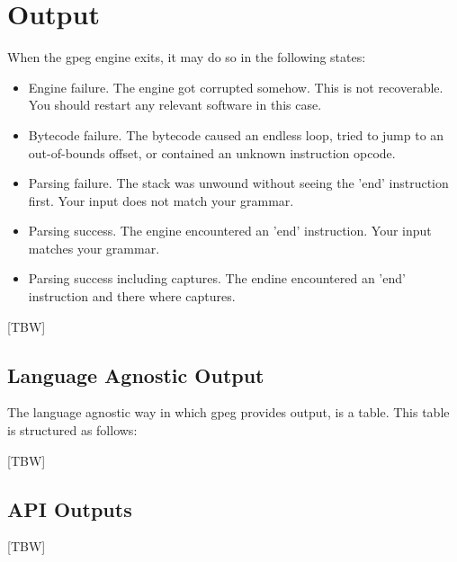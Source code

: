 \section{Output}

When the gpeg engine exits, it may do so in the following states:

\begin{itemize}
\item Engine failure. The engine got corrupted somehow. This is not
      recoverable. You should restart any relevant software in this case.
\item Bytecode failure. The bytecode caused an endless loop, tried
      to jump to an out-of-bounds offset, or contained an unknown
      instruction opcode.
\item Parsing failure. The stack was unwound without seeing the 'end'
      instruction first. Your input does not match your grammar.
\item Parsing success. The engine encountered an 'end' instruction.
      Your input matches your grammar.
\item Parsing success including captures.
      The endine encountered an 'end' instruction and there where
      captures.
\end{itemize}

[TBW]

\subsection{Language Agnostic Output}

The language agnostic way in which gpeg provides output, is a table.
This table is structured as follows:

[TBW]

\subsection{API Outputs}

[TBW]
